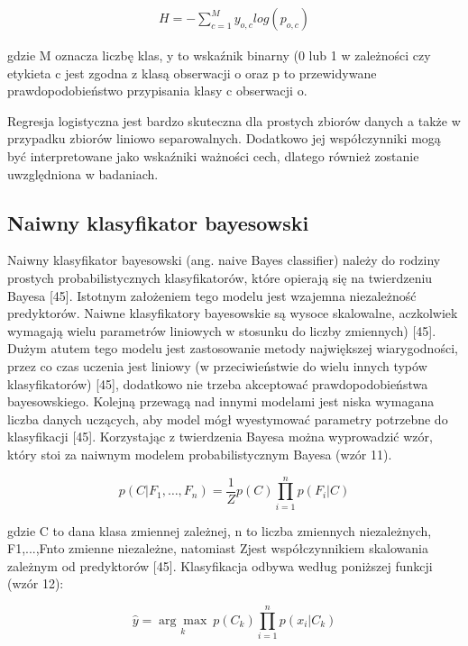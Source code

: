 \begin{align*}
H=-\sum_{c=1}^{M}y_{o,c}log(p_{o,c})
\end{align*}

\noindent gdzie M oznacza liczbę klas, y to wskaźnik binarny (0 lub 1 w zależności czy etykieta c jest zgodna z klasą obserwacji o oraz p to przewidywane prawdopodobieństwo przypisania klasy c obserwacji o.

Regresja logistyczna jest bardzo skuteczna dla prostych zbiorów danych a także w przypadku zbiorów liniowo separowalnych. Dodatkowo jej współczynniki mogą być interpretowane jako wskaźniki ważności cech, dlatego również zostanie uwzględniona w badaniach.


\subsection{Naiwny klasyfikator bayesowski}
\label{cha:Naiwny klasyfikator bayesowski}

Naiwny klasyfikator bayesowski (ang. naive Bayes classifier) należy do rodziny prostych probabilistycznych klasyfikatorów, które opierają się na twierdzeniu Bayesa [45]. Istotnym założeniem tego modelu jest wzajemna niezależność predyktorów. Naiwne klasyfikatory bayesowskie są wysoce skalowalne, aczkolwiek wymagają wielu parametrów liniowych w stosunku do liczby zmiennych) [45]. Dużym atutem tego modelu jest zastosowanie metody największej wiarygodności, przez co czas uczenia jest liniowy (w przeciwieństwie do wielu innych typów klasyfikatorów) [45], dodatkowo nie trzeba akceptować prawdopodobieństwa bayesowskiego. Kolejną przewagą nad innymi modelami jest niska wymagana liczba danych uczących, aby model mógł wyestymować parametry potrzebne do klasyfikacji [45]. Korzystając z twierdzenia Bayesa można wyprowadzić wzór, który stoi za naiwnym modelem probabilistycznym Bayesa (wzór 11).

\begin{equation}
p(C|F_1,\dots,F_n)=\frac 1 Zp(C)\prod_{i=1}^{n}p(F_i|C)
\end{equation}

\noindent gdzie C to dana klasa zmiennej zależnej, n to liczba zmiennych niezależnych, F1,...,Fnto zmienne niezależne, natomiast Zjest współczynnikiem skalowania zależnym od predyktorów [45]. Klasyfikacja odbywa według poniższej funkcji (wzór 12):

\begin{equation}
\hat y=\underset{k}{\arg\max}\ p(C_k)\prod_{i=1}^{n}p(x_i|C_k)
\end{equation}

